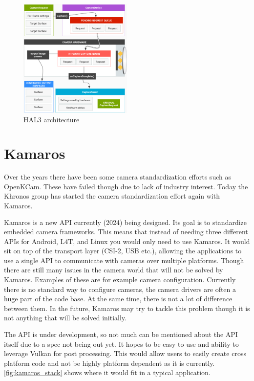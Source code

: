 \begin{figure}
    \begin{center}
        \includegraphics[width=0.5\textwidth]{figures/hal3arch}
    \end{center}
    \caption{HAL3 architecture \cite{hal3arch}}\label{fig:hal3arch}
\end{figure}

\section{Kamaros}
Over the years there have been some camera standardization efforts such as
OpenKCam. These have failed though due to lack of industry interest. Today
the Khronos group has started the camera standardization effort again with
Kamaros.

Kamaros is a new API currently (2024) being designed. Its goal is to
standardize embedded camera frameworks. This means that instead of needing
three different APIs for Android, L4T, and Linux you would only need to use
Kamaros. It would sit on top of the transport layer (CSI-2, USB etc.), allowing
the applications to use a single API to communicate with cameras over multiple
platforms. Though there are still many issues in the camera world that will not
be solved by Kamaros. Examples of these are for example camera configuration.
Currently there is no standard way to configure cameras, the camera drivers are
often a huge part of the code base. At the same time, there is not a lot of
difference between them. In the future, Kamaros may try to tackle this problem
though it is not anything that will be solved initially.

The API is under development, so not much can be mentioned about the API itself
due to a spec not being out yet. It hopes to be easy to use and ability to
leverage Vulkan for post processing. This would allow users to easily create
cross platform code and not be highly platform dependent as it is currently.
\cref{fig:kamaros_stack} shows where it would fit in a typical application.

